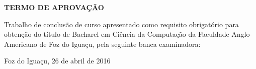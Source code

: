 \begin{folhadeaprovacao} %
\begin{center}
	\vspace*{1cm}  
  	\large\textbf{TERMO DE APROVAÇÃO}
  	
  	\vspace*{1cm} %
  	{\large\textbf\imprimirautor}

   \vspace*{1cm} %
    {\large\textbf\imprimirtitulo}   
 \end{center}     
  
	
	\hspace{.4\textwidth}
	\SingleSpace\noindent\normalsize{Trabalho de conclusão de curso apresentado como requisito obrigatório para obtenção do título de Bacharel em Ciência da Computação da Faculdade Anglo-Americano de Foz do Iguaçu, pela seguinte banca examinadora:}
   
    
  
   \vspace*{0.5cm}  %
   \vspace*{2.5cm}
   \begin{center}
   	{Foz do Iguaçu, 26 de abril de 2016}
   \end{center}
   
 
\end{folhadeaprovacao}